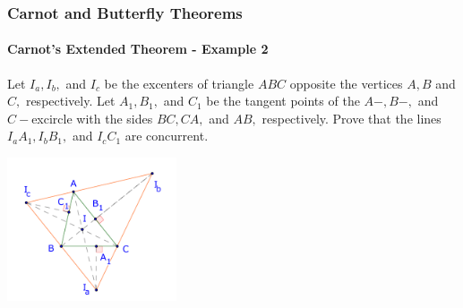 \documentclass[8pt,xcolor=table,dvipsnames]{beamer}
\begin{document}
\begin{frame}[t]
    \frametitle{Carnot and Butterfly Theorems}
    \framesubtitle{Carnot's Extended Theorem - Example 2}
    \begin{example}
        Let $I_a, I_b,$ and $I_c$ be the excenters of triangle $ABC$ opposite the vertices $A, B$ and $C,$ respectively.
        Let $A_1, B_1,$ and $C_1$ be the tangent points of the $A-, B-,$ and $C-$excircle with the sides $BC, CA,$ and $AB,$ respectively.
        Prove that the lines $I_a A_1, I_b B_1,$ and $I_c C_1$ are concurrent.    
    \end{example}

    \bigbreak
    \begin{center}
        \includegraphics[width=5cm]{./svg/pdf/24-25-s7-g3-p2.pdf}
    \end{center}
\end{frame}
\end{document}
